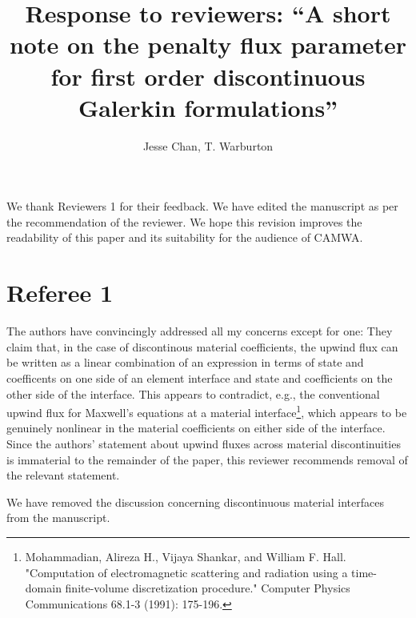 \documentclass[10pt]{article}
\date{}
\author{Jesse Chan, T. Warburton}
\title{Response to reviewers: ``A short note on the penalty flux parameter for first order discontinuous Galerkin formulations''}
\newcommand{\note}[1]{{\color{blue}#1}}
\begin{document}
\maketitle

\note{We thank Reviewers 1 for their feedback.  We have edited the manuscript as per the recommendation of the reviewer. We hope this revision improves the readability of this paper and its suitability for the audience of CAMWA.}

\section{Referee 1}

The authors have convincingly addressed all my concerns except for one: They claim that, in the case of discontinous material coefficients, the upwind flux can be written as a linear combination of an expression in terms of state and coefficents on one side of an element interface and state and coefficients on the other side of the interface. This appears to contradict, e.g., the conventional upwind flux for Maxwell's equations at a material interface\footnote{Mohammadian, Alireza H., Vijaya Shankar, and William F. Hall. "Computation of electromagnetic scattering and radiation using a time-domain finite-volume discretization procedure." Computer Physics Communications 68.1-3 (1991): 175-196.}, which appears to be genuinely nonlinear in the material coefficients on either side of the interface. Since the authors' statement about upwind fluxes across material discontinuities is immaterial to the remainder of the paper, this reviewer recommends removal of the relevant statement.

\note{We have removed the discussion concerning discontinuous material interfaces from the manuscript.}



\end{document}
